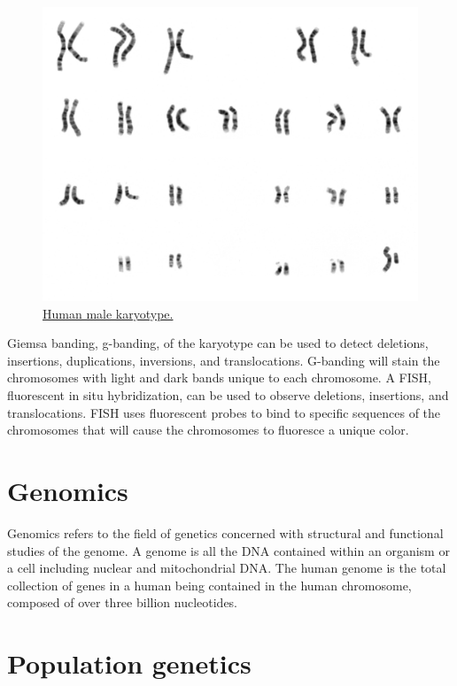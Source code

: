 \begin{figure}

{\centering \includegraphics[width=0.7\linewidth]{./figures/chromosomes/human_male_karyotype} 

}

\caption{\href{https://commons.wikimedia.org/wiki/File:NHGRI_human_male_karyotype.png}{Human male karyotype.}}\label{fig:karyotype}
\end{figure}

Giemsa banding, g-banding, of the karyotype can be used to detect deletions, insertions, duplications, inversions, and translocations. G-banding will stain the chromosomes with light and dark bands unique to each chromosome. A FISH, fluorescent in situ hybridization, can be used to observe deletions, insertions, and translocations. FISH uses fluorescent probes to bind to specific sequences of the chromosomes that will cause the chromosomes to fluoresce a unique color.

\hypertarget{genomics}{%
\section{Genomics}\label{genomics}}

Genomics refers to the field of genetics concerned with structural and functional studies of the genome. A genome is all the DNA contained within an organism or a cell including nuclear and mitochondrial DNA. The human genome is the total collection of genes in a human being contained in the human chromosome, composed of over three billion nucleotides.

\hypertarget{population-genetics}{%
\section{Population genetics}\label{population-genetics}}

